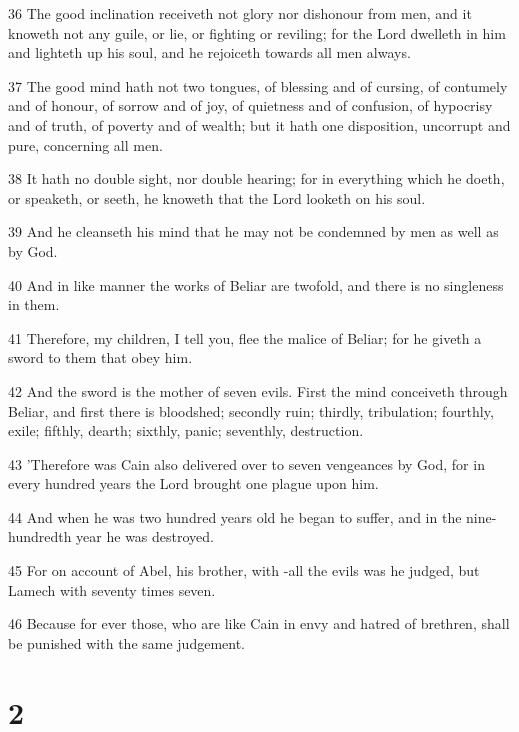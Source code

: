 \par 36 The good inclination receiveth not glory nor dishonour from men, and it knoweth not any guile, or lie, or fighting or reviling; for the Lord dwelleth in him and lighteth up his soul, and he rejoiceth towards all men always.

\par 37 The good mind hath not two tongues, of blessing and of cursing, of contumely and of honour, of sorrow and of joy, of quietness and of confusion, of hypocrisy and of truth, of poverty and of wealth; but it hath one disposition, uncorrupt and pure, concerning all men.

\par 38 It hath no double sight, nor double hearing; for in everything which he doeth, or speaketh, or seeth, he knoweth that the Lord looketh on his soul.

\par 39 And he cleanseth his mind that he may not be condemned by men as well as by God.

\par 40 And in like manner the works of Beliar are twofold, and there is no singleness in them.

\par 41 Therefore, my children, I tell you, flee the malice of Beliar; for he giveth a sword to them that obey him.

\par 42 And the sword is the mother of seven evils. First the mind conceiveth through Beliar, and first there is bloodshed; secondly ruin; thirdly, tribulation; fourthly, exile; fifthly, dearth; sixthly, panic; seventhly, destruction.

\par 43 'Therefore was Cain also delivered over to seven vengeances by God, for in every hundred years the Lord brought one plague upon him.

\par 44 And when he was two hundred years old he began to suffer, and in the nine-hundredth year he was destroyed.

\par 45 For on account of Abel, his brother, with -all the evils was he judged, but Lamech with seventy times seven.

\par 46 Because for ever those, who are like Cain in envy and hatred of brethren, shall be punished with the same judgement.

\chapter{2}

